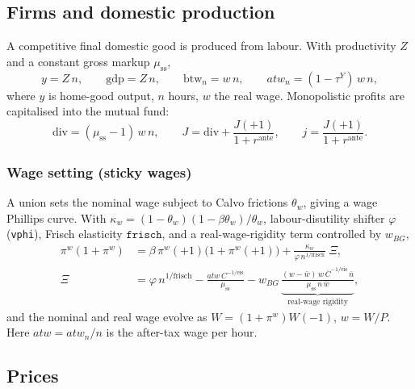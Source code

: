 \documentclass[11pt,a4paper]{article}
\newcommand{\stst}{\mathrm{ss}}
\begin{document}
\subsection{Firms and domestic production}\label{sec:firms}

A competitive final domestic good is produced from labour. With productivity $Z$
and a constant gross markup $\mu_{\stst}$,
\begin{equation}
y = Z\,n,\qquad
\mathrm{gdp}=Z\,n,\qquad
\text{btw}_n = w\,n,\qquad
atw_n = (1-\tau^{Y})\,w\,n,
\end{equation}
where $y$ is home-good output, $n$ hours, $w$ the real wage. Monopolistic
profits are capitalised into the mutual fund:
\begin{equation}
\mathrm{div}=(\mu_{\stst}-1)\,w\,n,\qquad
J=\mathrm{div}+\frac{J(+1)}{1+r^{\text{ante}}},\qquad
j=\frac{J(+1)}{1+r^{\text{ante}}}.
\end{equation}

\subsubsection{Wage setting (sticky wages)}\label{sec:union}

A union sets the nominal wage subject to Calvo frictions $\theta_w$, giving a
wage Phillips curve. With $\kappa_w=(1-\theta_w)(1-\beta\theta_w)/\theta_w$,
labour-disutility shifter $\varphi$ (\texttt{vphi}), Frisch elasticity
$\texttt{frisch}$, and a real-wage-rigidity term controlled by $w_{BG}$,
\begin{align}
\pi^{w}(1+\pi^{w})
&=\beta\,\pi^{w}(+1)\bigl(1+\pi^{w}(+1)\bigr)
+\frac{\kappa_w}{\varphi\,n^{1/\text{frisch}}}\;\Xi,\\
\Xi &= \varphi\,n^{1/\text{frisch}}
-\frac{atw\,C^{-1/\text{eis}}}{\mu_{\stst}}
- w_{BG}\,\underbrace{\frac{(w-\bar w)\,w\,\bar C^{-1/\text{eis}}\,\bar n}{\mu_{\stst}\,n\,\bar w}}_{\text{real-wage rigidity}},
\end{align}
and the nominal and real wage evolve as $W=(1+\pi^{w})W(-1)$, $w=W/P$. Here
$atw=atw_n/n$ is the after-tax wage per hour.

\subsection{Prices}\label{sec:prices}
\end{document}
